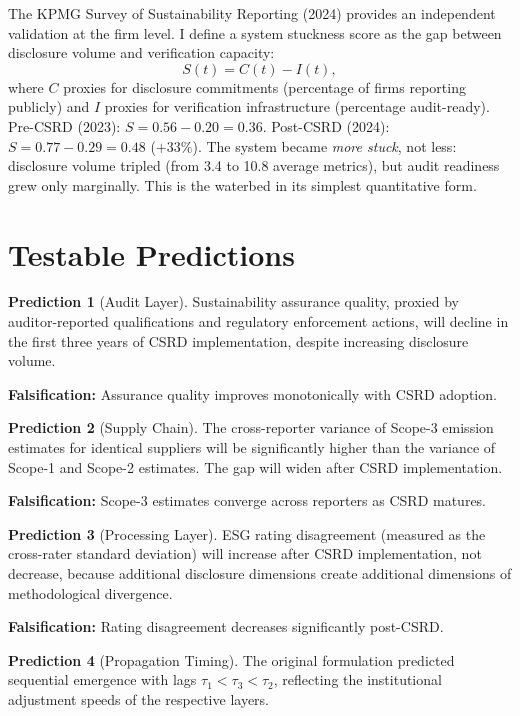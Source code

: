 \documentclass[12pt,a4paper]{article}
\begin{document}
The KPMG Survey of Sustainability Reporting (2024) provides an independent validation at the firm level. I define a system stuckness score as the gap between disclosure volume and verification capacity:
\begin{equation}
S(t) = C(t) - I(t),
\label{eq:stuckness}
\end{equation}
where $C$ proxies for disclosure commitments (percentage of firms reporting publicly) and $I$ proxies for verification infrastructure (percentage audit-ready). Pre-CSRD (2023): $S = 0.56 - 0.20 = 0.36$. Post-CSRD (2024): $S = 0.77 - 0.29 = 0.48$ ($+33\%$). The system became \textit{more stuck}, not less: disclosure volume tripled (from 3.4 to 10.8 average metrics), but audit readiness grew only marginally. This is the waterbed in its simplest quantitative form.


\section{Testable Predictions}
\label{sec:predictions}

\textbf{Prediction 1} (Audit Layer). Sustainability assurance quality, proxied by auditor-reported qualifications and regulatory enforcement actions, will decline in the first three years of CSRD implementation, despite increasing disclosure volume.

\textbf{Falsification:} Assurance quality improves monotonically with CSRD adoption.

\textbf{Prediction 2} (Supply Chain). The cross-reporter variance of Scope-3 emission estimates for identical suppliers will be significantly higher than the variance of Scope-1 and Scope-2 estimates. The gap will widen after CSRD implementation.

\textbf{Falsification:} Scope-3 estimates converge across reporters as CSRD matures.

\textbf{Prediction 3} (Processing Layer). ESG rating disagreement (measured as the cross-rater standard deviation) will increase after CSRD implementation, not decrease, because additional disclosure dimensions create additional dimensions of methodological divergence.

\textbf{Falsification:} Rating disagreement decreases significantly post-CSRD.

\textbf{Prediction 4} (Propagation Timing). The original formulation predicted sequential emergence with lags $\tau_1 < \tau_3 < \tau_2$, reflecting the institutional adjustment speeds of the respective layers.
\end{document}
